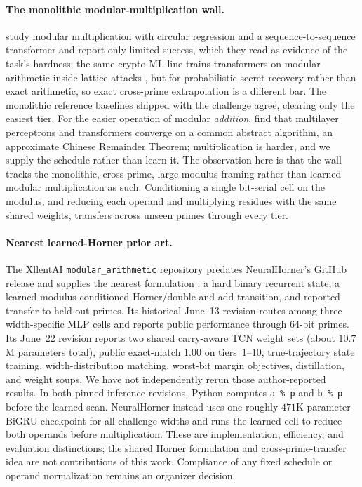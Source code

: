 \documentclass[11pt]{article}
\begin{document}
\paragraph{The monolithic modular-multiplication wall.}
\citet{lauter2024modular} study modular multiplication with circular regression and
a sequence-to-sequence transformer and report only limited success, which
they read as evidence of the task's hardness; the same crypto-ML line trains
transformers on modular arithmetic inside lattice attacks \citep{salsa2022}, but for
probabilistic secret recovery rather than exact arithmetic, so exact cross-prime
extrapolation is a different bar. The
monolithic reference baselines shipped with the challenge agree, clearing only the
easiest tier. For the easier operation of modular \emph{addition},
\citet{mccracken2025modadd} find that multilayer perceptrons and transformers
converge on a common abstract algorithm, an approximate Chinese Remainder Theorem;
multiplication is harder, and we supply the schedule rather than learn it. The
observation here is that the wall tracks the monolithic, cross-prime, large-modulus framing rather than
learned modular multiplication as such. Conditioning a single bit-serial cell
on the modulus, and reducing each operand and multiplying residues with the same
shared weights, transfers across unseen primes through every tier.

\paragraph{Nearest learned-Horner prior art.}
The XllentAI \texttt{modular\_arithmetic} repository predates NeuralHorner's
GitHub release and supplies the nearest formulation \citep{xllent2026horner}: a
hard binary recurrent state, a learned modulus-conditioned
Horner/double-and-add transition, and reported transfer to held-out primes. Its
historical June~13 revision routes among three width-specific MLP cells and
reports public performance through $64$-bit primes. Its June~22 revision reports
two shared carry-aware TCN weight sets (about $10.7$M parameters total), public
exact-match $1.00$ on tiers~$1$--$10$, true-trajectory state training,
width-distribution matching, worst-bit margin objectives, distillation, and
weight soups. We have not independently rerun those author-reported results. In
both pinned inference revisions, Python computes \texttt{a \% p} and
\texttt{b \% p} before the learned scan. NeuralHorner instead uses one roughly
$471$K-parameter BiGRU checkpoint for all challenge widths and runs the learned
cell to reduce both operands before multiplication. These are implementation,
efficiency, and evaluation distinctions; the shared Horner formulation and
cross-prime-transfer idea are not contributions of this work. Compliance of any
fixed schedule or operand normalization remains an organizer decision.
\end{document}
